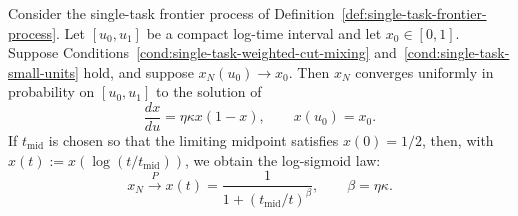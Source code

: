 \begin{theorem}
\label{thm:single-task-frontier-limit-new}
Consider the single-task frontier process of Definition~\ref{def:single-task-frontier-process}. Let $[u_0,u_1]$ be a compact log-time interval and let $x_0\in[0,1]$. Suppose Conditions~\ref{cond:single-task-weighted-cut-mixing} and~\ref{cond:single-task-small-units} hold, and suppose $x_N(u_0)\to x_0$. Then $x_N$ converges uniformly in probability on $[u_0,u_1]$ to the solution of
\begin{equation}
    \frac{dx}{du}=\eta\kappa x(1-x),
    \qquad x(u_0)=x_0.
    \label{eq:single-task-logistic-ode-new}
\end{equation}
If \(t_{\mathrm{mid}}\) is chosen so that the limiting midpoint satisfies $x(0)=1/2$, then, with $x(t):=x(\log(t/t_{\mathrm{mid}}))$, we obtain the log-sigmoid law:
\begin{equation}
    x_N \stackrel{P}{\longrightarrow}  
    x(t)=\frac{1}{1+(t_{\mathrm{mid}}/t)^\beta},
    \qquad
    \beta=\eta\kappa.
    \label{eq:single-task-logsigmoid-limit-new}
\end{equation}
\end{theorem}

